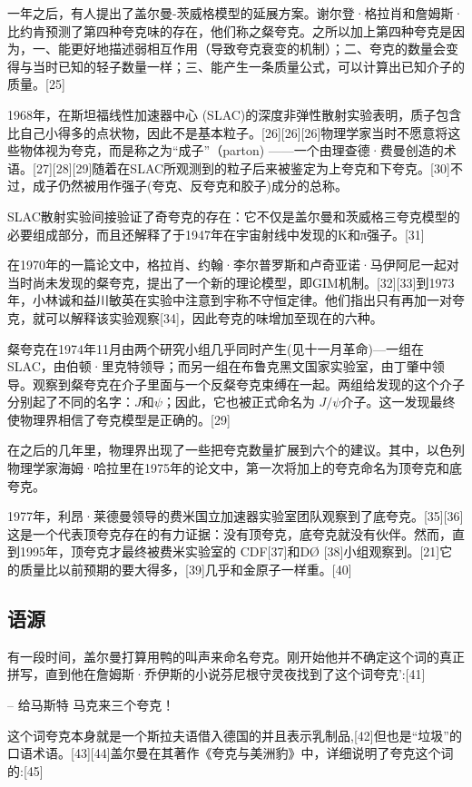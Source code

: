 一年之后，有人提出了盖尔曼-茨威格模型的延展方案。谢尔登·格拉肖和詹姆斯·比约肯预测了第四种夸克味的存在，他们称之粲夸克。之所以加上第四种夸克是因为，一、能更好地描述弱相互作用（导致夸克衰变的机制）；二、夸克的数量会变得与当时已知的轻子数量一样；三、能产生一条质量公式，可以计算出已知介子的质量。[25]

1968年，在斯坦福线性加速器中心 (SLAC)的深度非弹性散射实验表明，质子包含比自己小得多的点状物，因此不是基本粒子。[26][26][26]物理学家当时不愿意将这些物体视为夸克，而是称之为“成子”（parton) ——一个由理查德·费曼创造的术语。[27][28][29]随着在SLAC所观测到的粒子后来被鉴定为上夸克和下夸克。[30]不过，成子仍然被用作强子(夸克、反夸克和胶子)成分的总称。

SLAC散射实验间接验证了奇夸克的存在：它不仅是盖尔曼和茨威格三夸克模型的必要组成部分，而且还解释了于1947年在宇宙射线中发现的K和π强子。[31]

在1970年的一篇论文中，格拉肖、约翰·李尔普罗斯和卢奇亚诺·马伊阿尼一起对当时尚未发现的粲夸克，提出了一个新的理论模型，即GIM机制。[32][33]到1973年，小林诚和益川敏英在实验中注意到宇称不守恒定律。他们指出只有再加一对夸克，就可以解释该实验观察[34]，因此夸克的味增加至现在的六种。

粲夸克在1974年11月由两个研究小组几乎同时产生(见十一月革命)—一组在SLAC，由伯顿·里克特领导；而另一组在布鲁克黑文国家实验室，由丁肇中领导。观察到粲夸克在介子里面与一个反粲夸克束缚在一起。两组给发现的这个介子分别起了不同的名字：$J$和$\psi$；因此，它也被正式命名为 $J/\psi$介子。这一发现最终使物理界相信了夸克模型是正确的。[29]

在之后的几年里，物理界出现了一些把夸克数量扩展到六个的建议。其中，以色列物理学家海姆·哈拉里在1975年的论文中，第一次将加上的夸克命名为顶夸克和底夸克。

1977年，利昂·莱德曼领导的费米国立加速器实验室团队观察到了底夸克。[35][36]这是一个代表顶夸克存在的有力证据：没有顶夸克，底夸克就没有伙伴。然而，直到1995年，顶夸克才最终被费米实验室的 CDF[37]和DØ [38]小组观察到。[21]它的质量比以前预期的要大得多，[39]几乎和金原子一样重。[40]

\subsection{语源}
有一段时间，盖尔曼打算用鸭的叫声来命名夸克。刚开始他并不确定这个词的真正拼写，直到他在詹姆斯·乔伊斯的小说芬尼根守灵夜找到了这个词夸克':[41]

– 给马斯特 马克来三个夸克！

这个词夸克本身就是一个斯拉夫语借入德国的并且表示乳制品,[42]但也是“垃圾”的口语术语。[43][44]盖尔曼在其著作《夸克与美洲豹》中，详细说明了夸克这个词的:[45]

